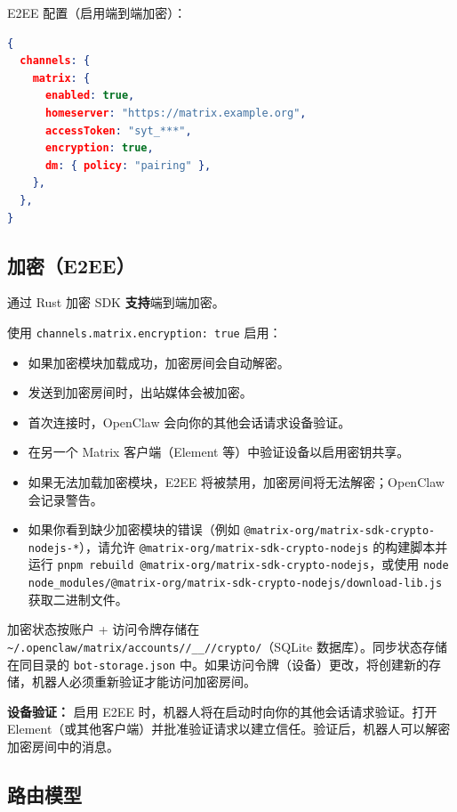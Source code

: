 E2EE 配置（启用端到端加密）：

\begin{lstlisting}[language=json]
{
  channels: {
    matrix: {
      enabled: true,
      homeserver: "https://matrix.example.org",
      accessToken: "syt_***",
      encryption: true,
      dm: { policy: "pairing" },
    },
  },
}
\end{lstlisting}


\subsection{加密（E2EE）}


通过 Rust 加密 SDK \textbf{支持}端到端加密。

使用 \texttt{channels.matrix.encryption: true} 启用：

\begin{itemize}
  \item 如果加密模块加载成功，加密房间会自动解密。
  \item 发送到加密房间时，出站媒体会被加密。
  \item 首次连接时，OpenClaw 会向你的其他会话请求设备验证。
  \item 在另一个 Matrix 客户端（Element 等）中验证设备以启用密钥共享。
  \item 如果无法加载加密模块，E2EE 将被禁用，加密房间将无法解密；OpenClaw 会记录警告。
  \item 如果你看到缺少加密模块的错误（例如 \texttt{@matrix-org/matrix-sdk-crypto-nodejs-*}），请允许 \texttt{@matrix-org/matrix-sdk-crypto-nodejs} 的构建脚本并运行 \texttt{pnpm rebuild @matrix-org/matrix-sdk-crypto-nodejs}，或使用 \texttt{node node\_modules/@matrix-org/matrix-sdk-crypto-nodejs/download-lib.js} 获取二进制文件。
\end{itemize}


加密状态按账户 + 访问令牌存储在 \texttt{\textasciitilde{}/.openclaw/matrix/accounts//\_\_//crypto/}（SQLite 数据库）。同步状态存储在同目录的 \texttt{bot-storage.json} 中。如果访问令牌（设备）更改，将创建新的存储，机器人必须重新验证才能访问加密房间。

\textbf{设备验证：}
启用 E2EE 时，机器人将在启动时向你的其他会话请求验证。打开 Element（或其他客户端）并批准验证请求以建立信任。验证后，机器人可以解密加密房间中的消息。

\subsection{路由模型}


